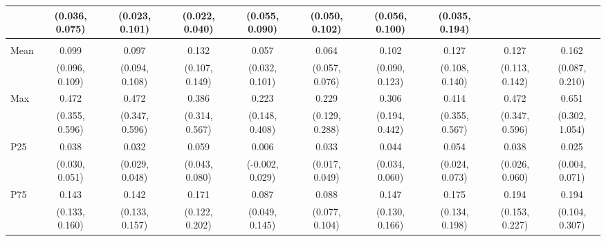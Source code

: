 {\begin{tabular}{l|c|c|c|c|c|c|c|c|c}
& {\scriptsize (0.036, 0.075)}
& {\scriptsize (0.023, 0.101)}
& {\scriptsize (0.022, 0.040)}
& {\scriptsize (0.055, 0.090)}
& {\scriptsize (0.050, 0.102)}
& {\scriptsize (0.056, 0.100)}
& {\scriptsize (0.035, 0.194)}
\\ [0.1cm]
\hline
\noalign{\smallskip}
\multicolumn{10}{l}{\textbf{Effect with Leads and Lags}} \\
\noalign{\smallskip}
\hline
Mean
& 0.099 & 0.097 & 0.132 & 0.057 & 0.064 & 0.102 & 0.127 & 0.127 & 0.162 \\
& {\scriptsize (0.096, 0.109)}
& {\scriptsize (0.094, 0.108)}
& {\scriptsize (0.107, 0.149)}
& {\scriptsize (0.032, 0.101)}
& {\scriptsize (0.057, 0.076)}
& {\scriptsize (0.090, 0.123)}
& {\scriptsize (0.108, 0.140)}
& {\scriptsize (0.113, 0.142)}
& {\scriptsize (0.087, 0.210)}
\\ [0.1cm]
\hline
Max
& 0.472 & 0.472 & 0.386 & 0.223 & 0.229 & 0.306 & 0.414 & 0.472 & 0.651 \\
& {\scriptsize (0.355, 0.596)}
& {\scriptsize (0.347, 0.596)}
& {\scriptsize (0.314, 0.567)}
& {\scriptsize (0.148, 0.408)}
& {\scriptsize (0.129, 0.288)}
& {\scriptsize (0.194, 0.442)}
& {\scriptsize (0.355, 0.567)}
& {\scriptsize (0.347, 0.596)}
& {\scriptsize (0.302, 1.054)}
\\ [0.1cm]
\hline
P25
& 0.038 & 0.032 & 0.059 & 0.006 & 0.033 & 0.044 & 0.054 & 0.038 & 0.025 \\
& {\scriptsize (0.030, 0.051)}
& {\scriptsize (0.029, 0.048)}
& {\scriptsize (0.043, 0.080)}
& {\scriptsize (-0.002, 0.029)}
& {\scriptsize (0.017, 0.049)}
& {\scriptsize (0.034, 0.060)}
& {\scriptsize (0.024, 0.073)}
& {\scriptsize (0.026, 0.060)}
& {\scriptsize (0.004, 0.071)}
\\ [0.1cm]
\hline
P75
& 0.143 & 0.142 & 0.171 & 0.087 & 0.088 & 0.147 & 0.175 & 0.194 & 0.194 \\
& {\scriptsize (0.133, 0.160)}
& {\scriptsize (0.133, 0.157)}
& {\scriptsize (0.122, 0.202)}
& {\scriptsize (0.049, 0.145)}
& {\scriptsize (0.077, 0.104)}
& {\scriptsize (0.130, 0.166)}
& {\scriptsize (0.134, 0.198)}
& {\scriptsize (0.153, 0.227)}
& {\scriptsize (0.104, 0.307)}
\\ [0.1cm]
\hline
\hline
\end{tabular}
}
